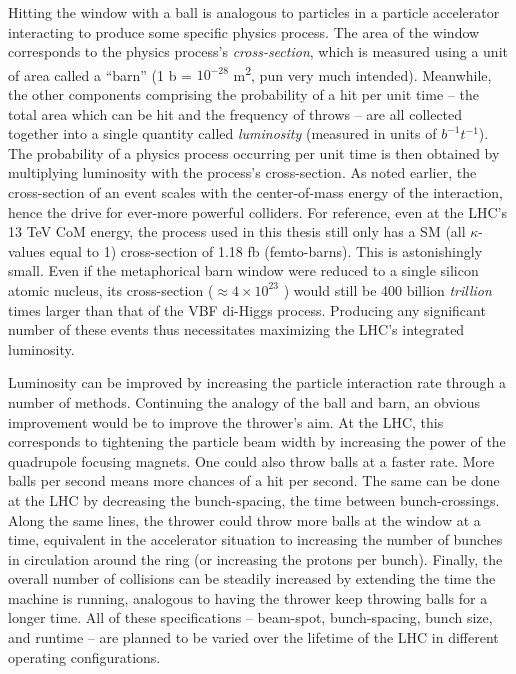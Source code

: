     Hitting the window with a ball is analogous to particles in a particle accelerator interacting to produce some specific physics process.
    The area of the window corresponds to the physics process's \textit{cross-section}, which is measured using a unit of area called a ``barn'' (1 b = $10^{-28}$ m\textsuperscript{2}, pun very much intended).
    Meanwhile, the other components comprising the probability of a hit per unit time
        -- the total area which can be hit and the frequency of throws --
        are all collected together into a single quantity called \textit{luminosity} (measured in units of $b^{-1}t^{-1}$). 
    The probability of a physics process occurring per unit time is then obtained by multiplying luminosity with the process's cross-section.
    As noted earlier, the cross-section of an event scales with the center-of-mass energy of the interaction,
        hence the drive for ever-more powerful colliders.
    For reference, even at the LHC's 13 TeV CoM energy,
        the \vbfhhproc process used in this thesis still only has a SM (all $\kappa$-values equal to 1) cross-section of 1.18 fb (femto-barns).
    This is astonishingly small.
    Even if the metaphorical barn window were reduced to a single silicon atomic nucleus,
        its cross-section ($\approx 4 \times 10^{23}$ \ifb)
        would still be 400 billion \textit{trillion} times larger than that of the VBF di-Higgs process.
    Producing any significant number of these events thus necessitates maximizing the LHC's integrated luminosity.

    Luminosity can be improved by increasing the particle interaction rate through a number of methods.
    Continuing the analogy of the ball and barn, an obvious improvement would be to improve the thrower's aim.
    At the LHC, this corresponds to tightening the particle beam width by increasing the power of the quadrupole focusing magnets.
    One could also throw balls at a faster rate.
    More balls per second means more chances of a hit per second.
    The same can be done at the LHC by decreasing the bunch-spacing, the time between bunch-crossings.
    Along the same lines, the thrower could throw more balls at the window at a time,
        equivalent in the accelerator situation to increasing the number of bunches in circulation around the ring
        (or increasing the protons per bunch).
    Finally, the overall number of collisions can be steadily increased by extending the time the machine is running, analogous to having the thrower keep throwing balls for a longer time.
    All of these specifications -- beam-spot, bunch-spacing, bunch size, and runtime -- are planned to be varied over the lifetime of the LHC in different operating configurations.
    
